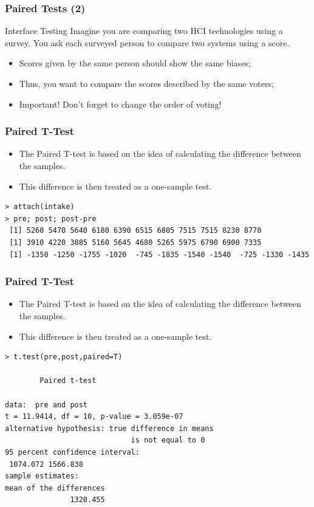 \documentclass[10pt]{beamer}
\begin{document}
\begin{frame}
  \frametitle{Paired Tests (2)}
  \begin{block}{Interface Testing}
    Imagine you are comparing two HCI technologies using a survey. You
    ask each surveyed person to compare two systems using a score.
  \end{block}
  \bigskip

  \begin{itemize}
  \item Scores given by the same person should show the same biases;
  \item Thus, you want to compare the scores described by the same voters;
  \item \alert{Important!} Don't forget to change the order of voting!
  \end{itemize}
\end{frame}

\begin{frame}
  \frametitle{Paired T-Test}
  \begin{itemize}
  \item The Paired T-test is based on the idea of calculating the
    difference between the samples. 
  \item This difference is then treated as
    a one-sample test.
  \end{itemize}
  \begin{block}{}
{\small
\begin{verbatim}
> attach(intake)
> pre; post; post-pre
 [1] 5260 5470 5640 6180 6390 6515 6805 7515 7515 8230 8770
 [1] 3910 4220 3885 5160 5645 4680 5265 5975 6790 6900 7335
 [1] -1350 -1250 -1755 -1020  -745 -1835 -1540 -1540  -725 -1330 -1435
\end{verbatim}}
\end{block}
\end{frame}

\begin{frame}
  \frametitle{Paired T-Test}
  \begin{itemize}
  \item The Paired T-test is based on the idea of calculating the
    difference between the samples. 
  \item This difference is then treated as
    a one-sample test.
  \end{itemize}
  \begin{block}{}
{\small
\begin{verbatim}
> t.test(pre,post,paired=T)

        Paired t-test

data:  pre and post 
t = 11.9414, df = 10, p-value = 3.059e-07
alternative hypothesis: true difference in means 
                             is not equal to 0 
95 percent confidence interval:
 1074.072 1566.838 
sample estimates:
mean of the differences 
               1320.455
\end{verbatim}}
  \end{block}
\end{frame}
\end{document}
